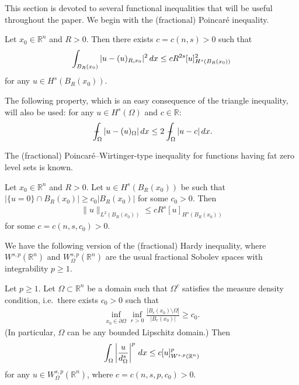 \documentclass[11pt,reqno]{amsart}
\theoremstyle{plain}
\theoremstyle{definition}
\numberwithin{equation}{section}
\newcommand{\R}{\mathbb{R}}
\newcommand{\1}{\mathbbm{1}}
\renewcommand{\d}{\textnormal{\,d}}
\newcommand{\average}{{\mathchoice {\kern1ex\vcenter{\hrule height.4pt
width 6pt depth0pt} \kern-9.7pt} {\kern1ex\vcenter{\hrule
height.4pt width 4.3pt depth0pt} \kern-7pt} {} {} }}
\newcommand{\dashint}{\average\int}
\begin{document}
This section is devoted to several functional inequalities that will be useful throughout the paper. We begin with the (fractional) Poincar\'e inequality.

\begin{proposition}\label{prop-Poincare}\cite[Corollary~2.1]{Pon04}
Let $x_0 \in \R^n$ and $R>0$. Then there exists $c=c(n, s)>0$ such that
\begin{align*}
\int_{B_R(x_0)} |u-(u)_{R, x_0}|^2 \d x \le c R^{2s} [u]^2_{H^s(B_R(x_0))}
\end{align*}
for any $u \in H^s(B_R(x_0))$.
\end{proposition}

The following property, which is an easy consequence of the triangle inequality, will also be used: for any $u \in H^s(\Omega)$ and $c \in \R$:
\begin{align}\label{eq-E-inf}
\dashint_{\Omega} |u-(u)_{\Omega}| \d x \le 2  {\dashint_{\Omega} |u-c| \d x}.
\end{align}



The (fractional) Poincar\'e--Wirtinger-type inequality for functions having fat zero level sets is known.

\begin{lemma}\cite[Lemma~4.7]{Coz17}
\label{lemma:Poincare-Wirtinger}
Let $x_0 \in \R^n$ and $R > 0$. Let $u \in H^s(B_R(x_0))$ be such that $|\{ u = 0\} \cap B_R(x_0)| \ge c_0 |B_R(x_0)|$ for some $c_0 > 0$. Then
\begin{align*}
\|u\|_{L^2(B_R(x_0))} \le c R^s [u]_{H^s(B_R(x_0))}
\end{align*}
for some $c =c(n, s, c_0)> 0$.
\end{lemma}

We have the following version of the (fractional) Hardy inequality, where $W^{s, p}(\R^n)$ and $W^{s, p}_\Omega(\R^n)$ are the usual fractional Sobolev spaces with integrability $p\geq 1$.

\begin{lemma}
\label{lemma:Hardy}
Let $p\geq 1$. Let $\Omega \subset \R^n$ be a domain such that $\Omega^c$ satisfies the measure density condition, i.e.\ there exists $c_0>0$ such that
\begin{align}
\label{eq:measure-density}
    \inf_{x_0 \in \partial \Omega} \inf_{r>0} \frac{|B_r(x_0) \setminus \Omega|}{|B_r(x_0)|} \geq c_0.
\end{align}
(In particular, $\Omega$ can be any bounded Lipschitz domain.)
Then
\begin{align*}
    \int_{\Omega} \left| \frac{u}{d_{\Omega}^s} \right|^p \d x \le c [u]^p_{W^{s, p}(\R^n)}
\end{align*}
for any $u \in W^{s, p}_\Omega(\R^n)$, where $c=c(n, s, p, c_0)>0$.
\end{lemma}
\end{document}
